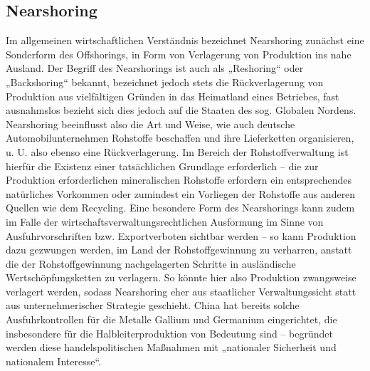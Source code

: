 \documentclass[12pt,a4paper,oneside]{book} %
\begin{document}
{	\subsection{Nearshoring}
	Im allgemeinen wirtschaftlichen Verständnis bezeichnet Nearshoring zunächst eine Sonderform des Offshorings, in Form von Verlagerung von Produktion ins nahe Ausland.\autocite{bendel_nearshoring_2022} Der Begriff des Nearshorings ist auch als „Reshoring“ oder „Backshoring“ bekannt, bezeichnet jedoch stets die Rückverlagerung von Produktion aus vielfältigen Gründen in das Heimatland eines Betriebes, fast ausnahmslos bezieht sich dies jedoch auf die Staaten des sog. Globalen Nordens.\autocite{butollo_deglobalisierung_2022} Nearshoring beeinflusst also die Art und Weise, wie auch deutsche Automobilunternehmen Rohstoffe beschaffen und ihre Lieferketten organisieren, u. U. also ebenso eine Rückverlagerung. Im Bereich der Rohstoffverwaltung ist hierfür die Existenz einer tatsächlichen Grundlage erforderlich – die zur Produktion erforderlichen mineralischen Rohstoffe erfordern ein entsprechendes natürliches Vorkommen oder zumindest ein Vorliegen der Rohstoffe aus anderen Quellen wie dem Recycling. Eine besondere Form des Nearshorings kann zudem im Falle der wirtschaftsverwaltungsrechtlichen Ausformung im Sinne von Ausfuhrvorschriften bzw. Exportverboten sichtbar werden – so kann Produktion dazu gezwungen werden, im Land der Rohstoffgewinnung zu verharren, anstatt die der Rohstoffgewinnung nachgelagerten Schritte in ausländische Wertschöpfungsketten zu verlagern. So könnte hier also Produktion zwangsweise verlagert werden, sodass Nearshoring eher aus staatlicher Verwaltungssicht statt aus unternehmerischer Strategie geschieht. China hat bereits solche Ausfuhrkontrollen für die Metalle Gallium und Germanium eingerichtet, die insbesondere für die Halbleiterproduktion von Bedeutung sind – begründet werden diese handelspolitischen Maßnahmen mit „nationaler Sicherheit und nationalem Interesse“. \autocite{lamby-schmitt_china_2023}
}
\end{document}
